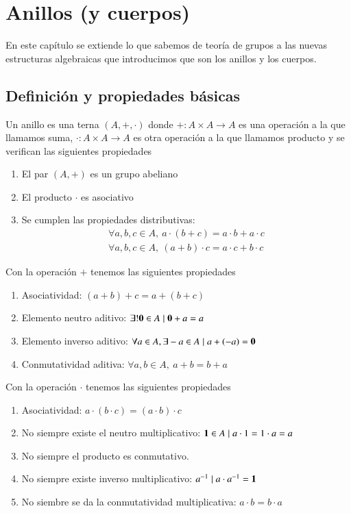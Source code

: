 
\chapter{Anillos (y cuerpos)}

En este capítulo se extiende lo que sabemos de teoría de grupos a las nuevas estructuras algebraicas que introducimos que son los anillos y los cuerpos.

\section{Definición y propiedades básicas}

\begin{dfn}[Anillo]
	Un anillo es una terna $(A, +, \cdot)$ donde $+: A \times A \to A$ es una operación a la que llamamos suma, $\cdot: A \times A \to A$ es otra operación a la que llamamos producto y se verifican las siguientes propiedades
	\begin{enumerate}
		\item El par $(A, +)$ es un grupo abeliano
		\item El producto $\cdot$ es asociativo
		\item Se cumplen las propiedades distributivas:
		\begin{align}
			\forall a, b , c \in A,\ a\cdot (b + c) = a\cdot b + a \cdot c \\
			\forall a, b , c \in A,\ (a + b) \cdot c = a\cdot c + b \cdot c
		\end{align}
	\end{enumerate}
\end{dfn}

Con la operación $+$ tenemos las siguientes propiedades
\begin{enumerate}
	\item Asociatividad: $(a+b)+c = a+(b+c)$
	\item Elemento neutro aditivo: $\exists! \mathbf{0} \in A \mid \mathbf{0}+a = a$
	\item Elemento inverso aditivo: $\forall a \in A, \exists -a \in A \mid a + (-a) = \mathbf{0}$
	\item Conmutatividad aditiva: $\forall a, b \in A,\ a+b = b+a$
\end{enumerate}

Con la operación $\cdot$ tenemos las siguientes propiedades
\begin{enumerate}
	\item Asociatividad: $a\cdot (b \cdot c) = (a \cdot b) \cdot c$
	\item No siempre existe el neutro multiplicativo: $\mathbf{1} \in A \mid a\cdot 1 = 1 \cdot a = a$
	\item No siempre el producto es conmutativo.
	\item No siempre existe inverso multiplicativo: $a^{-1} \mid a\cdot a^{-1} = \mathbf{1}$
	\item No siembre se da la conmutatividad multiplicativa: $a \cdot b = b\cdot a$
\end{enumerate}

